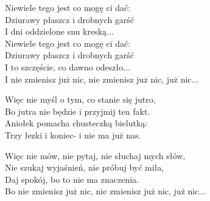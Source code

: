 \begin{text}
    Niewiele tego jest co mogę ci dać:\\
    Dziurawy płaszcz i drobnych garść\\
    I dni oddzielone snu kreską...\\
    Niewiele tego jest co mogę ci dać:\\
    Dziurawy płaszcz i drobnych garść\\
    I to szczęście, co dawno odeszło...\\
    I nie zmienisz już nic, nie zmienisz już nic, już nic...

    Więc nie myśl o tym, co stanie się jutro,\\
    Bo jutra nie będzie i przyjmij ten fakt.\\
    Aniołek pomacha chusteczką bielutką:\\
    Trzy łezki i koniec- i nie ma już nas.

    Więc nie mów, nie pytaj, nie słuchaj mych słów,\\
    Nie szukaj wyjaśnień, nie próbuj być miła,\\
    Daj spokój, bo to nie ma znaczenia.\\
    Bo nie zmienisz już nic, nie zmienisz już nic, już nic...
\end{text}
\begin{chord}

\end{chord}